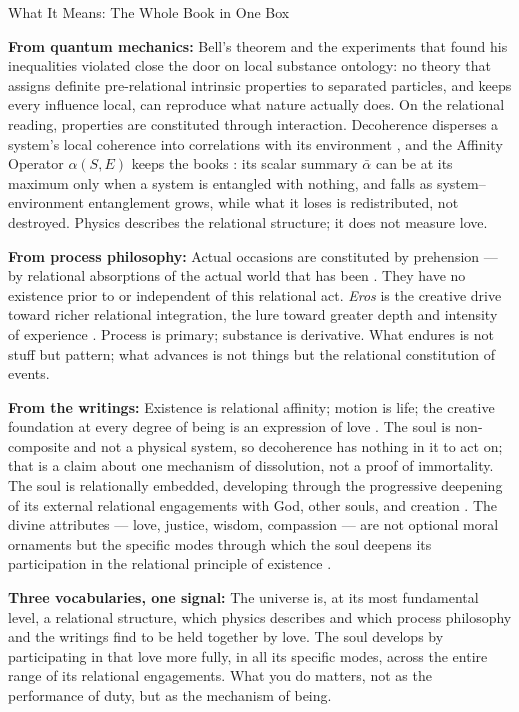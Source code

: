 \begin{convergencemoment}{What It Means: The Whole Book in One Box}

\textbf{From quantum mechanics:} Bell's theorem and the experiments that found
his inequalities violated
\citep{Bell1964,Aspect1982,Zeilinger2023Nobel} close the door on local substance
ontology: no theory that assigns definite pre-relational intrinsic properties to
separated particles, and keeps every influence local, can reproduce what nature
actually does.  On the relational reading, properties are constituted through
interaction.  Decoherence disperses a system's local coherence into
correlations with its environment \citep{Zurek2003}, and the Affinity Operator
$\alpha(S,E)$ keeps the books \citep{AdamsRCT}: its scalar summary
$\bar{\alpha}$ can be at its maximum only when a system is entangled with
nothing, and falls as system--environment entanglement grows, while what it
loses is redistributed, not destroyed.  Physics describes the relational
structure; it does not measure love.

\textbf{From process philosophy:} Actual occasions are constituted by prehension
--- by relational absorptions of the actual world that has been
\citep{Whitehead1929}.  They have no existence prior to or independent of this
relational act.  \emph{Eros} is the creative drive toward richer relational
integration, the lure toward greater depth and intensity of experience
\citep{Whitehead1933}.  Process is primary; substance is derivative.  What
endures is not stuff but pattern; what advances is not things but the relational
constitution of events.

\textbf{From the \bahai writings:} Existence is relational affinity; motion is
life; the creative foundation at every degree of being is an expression of love
\citep{PUP,SAQ,SummonsLordHosts}.  The soul is non-composite and not a physical
system, so decoherence has nothing in it to act on; that is a claim about one
mechanism of dissolution, not a proof of immortality.  The soul is relationally
embedded, developing through the
progressive deepening of its external relational engagements with God, other
souls, and creation \citep{GleaningsBahaullah,SAQ}.  The divine attributes ---
love, justice, wisdom, compassion --- are not optional moral ornaments but the
specific modes through which the soul deepens its participation in the relational
principle of existence \citep{HiddenWords,SelectionsAbdul}.

\textbf{Three vocabularies, one signal:} The universe is, at its most fundamental
level, a relational structure, which physics describes and which process
philosophy and the \bahai writings find to be held together by love.  The soul develops by
participating in that love more fully, in all its specific modes, across the
entire range of its relational engagements.  What you do matters, not as the
performance of duty, but as the mechanism of being.

\end{convergencemoment}
